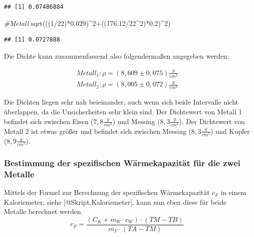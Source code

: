 \documentclass[class=article, crop=false]{standalone}
\newenvironment{Shaded}{\begin{snugshade}}{\end{snugshade}}
\newcommand{\CommentTok}[1]{\textcolor[rgb]{0.56,0.35,0.01}{\textit{#1}}}
\newcommand{\DecValTok}[1]{\textcolor[rgb]{0.00,0.00,0.81}{#1}}
\newcommand{\FloatTok}[1]{\textcolor[rgb]{0.00,0.00,0.81}{#1}}
\newcommand{\FunctionTok}[1]{\textcolor[rgb]{0.00,0.00,0.00}{#1}}
\newcommand{\NormalTok}[1]{#1}
\newcommand{\SpecialCharTok}[1]{\textcolor[rgb]{0.00,0.00,0.00}{#1}}
\begin{document}
\begin{verbatim}
## [1] 0.07486884
\end{verbatim}

\begin{Shaded}
\begin{Highlighting}[]
\CommentTok{\#Metall }
\FunctionTok{sqrt}\NormalTok{(((}\DecValTok{1}\SpecialCharTok{/}\DecValTok{22}\NormalTok{)}\SpecialCharTok{*}\FloatTok{0.029}\NormalTok{)}\SpecialCharTok{\^{}}\DecValTok{2}\SpecialCharTok{+}\NormalTok{((}\FloatTok{176.12}\SpecialCharTok{/}\DecValTok{22}\SpecialCharTok{\^{}}\DecValTok{2}\NormalTok{)}\SpecialCharTok{*}\FloatTok{0.2}\NormalTok{)}\SpecialCharTok{\^{}}\DecValTok{2}\NormalTok{)}
\end{Highlighting}
\end{Shaded}

\begin{verbatim}
## [1] 0.0727888
\end{verbatim}

Die Dichte kann zusammenfassend also folgendermaßen angegeben werden:

\begin{equation*}
\begin{split}
Metall_1: \rho = (8,609 \pm 0,075) \frac{g}{cm^3}\\
Metall_2: \rho = (8, 005\pm 0,072) \frac{g}{cm^3}
\end{split}
\end{equation*}

Die Dichten liegen sehr nah beieinander, auch wenn sich beide Intervalle
nicht überlappen, da die Unsicherheiten sehr klein sind. Der Dichtewert
von Metall 1 befindet sich zwischen Eisen (\(7,8 \frac{g}{cm^3}\)) und
Messing (\(8,3 \frac{g}{cm^3}\)). Der Dichtewert von Metall 2 ist etwas
größer und befindet sich zwischen Messing (\(8,3 \frac{g}{cm^3}\)) und
Kupfer (\(8,9 \frac{g}{cm^3}\)).

\hypertarget{bestimmung-der-spezifischen-wuxe4rmekapazituxe4t-fuxfcr-die-zwei-metalle}{%
\subsubsection{Bestimmung der spezifischen Wärmekapazität für die zwei
Metalle}\label{bestimmung-der-spezifischen-wuxe4rmekapazituxe4t-fuxfcr-die-zwei-metalle}}

Mittels der Formel zur Berechnung der spezifischen Wärmekapazität
\(c_F\) in einem Kaloriemeter, siehe {[}@Skript.Kaloriemeter{]}, kann
nun eben diese für beide Metalle berechnet werden.
\begin{equation}\label{Kaloriemeter:c_F}
c_F = \frac{(C_K + m_W\cdot c_W)\cdot (TM-TB)}{m_F\cdot (TA-TM)}
\end{equation}
\end{document}
